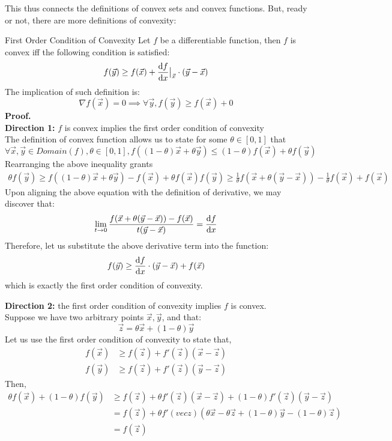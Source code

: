 This thus connects the definitions of convex sets and convex functions.
But, ready or not, there are more definitions of convexity:
\begin{ln-define}{First Order Condition of Convexity}{}
    Let $f$ be a differentiable function, then $f$ is convex iff the following condition is satisfied:
    \[
        f(\vec{y}) \geq f(\vec{x}) + \dv{f}{x} \big|_{\vec{x}} \cdot (\vec{y} - \vec{x})
    \]
    The implication of such definition is:
    \[
        \nabla f(\vec{x}) = 0 \implies \forall \vec{y}, f(\vec{y}) \geq f(\vec{x}) + 0
    \]
    \tcblower
    \textbf{Proof.} \\
    \textbf{Direction 1:} $f$ is convex implies the first order condition of convexity \\
    The definition of convex function allows us to state for some $\theta \in [0, 1]$ that
    \[
        \forall \vec{x}, \vec{y} \in Domain(f), \theta \in [0, 1], f((1 - \theta) \vec{x} + \theta \vec{y}) \leq (1 - \theta) f(\vec{x}) + \theta f(\vec{y})
    \]
    Rearranging the above inequality grants
    \begin{align*}
        \theta f(\vec{y}) \geq f((1 - \theta) \vec{x} + \theta \vec{y}) - f(\vec{x}) + \theta f(\vec{x})
        f(\vec{y}) \geq \frac{1}{\theta} f(\vec{x} + \theta (\vec{y} - \vec{x})) - \frac{1}{\theta} f(\vec{x}) + f(\vec{x})
    \end{align*}
    Upon aligning the above equation with the definition of derivative, we may discover that:
    \[
        \lim_{t \rightarrow 0} \frac{f(\vec{x} + \theta (\vec{y} - \vec{x})) - f(\vec{x})}{t (\vec{y} - \vec{x})} = \dv{f}{x}
    \]
    Therefore, let us substitute the above derivative term into the function:
    \[
        f(\vec{y}) \geq \dv{f}{x} \cdot (\vec{y} - \vec{x}) + f(\vec{x})
    \]
    which is exactly the first order condition of convexity.
    \par
    \textbf{Direction 2:} the first order condition of convexity implies $f$ is convex. \\
    Suppose we have two arbitrary points $\vec{x}, \vec{y}$, and that:
    \[
        \vec{z} = \theta \vec{x} + (1 - \theta) \vec{y}
    \]
    Let us use the first order condition of convexity to state that,
    \begin{align*}
        f(\vec{x}) &\geq f(\vec{z}) + f'(\vec{z}) (\vec{x} - \vec{z}) \\
        f(\vec{y}) &\geq f(\vec{z}) + f'(\vec{z}) (\vec{y} - \vec{z})
    \end{align*}
    Then,
    \begin{align*}
        \theta f(\vec{x}) + (1 - \theta) f(\vec{y})
        &\geq f(\vec{z}) + \theta f'(\vec{z}) (\vec{x} - \vec{z}) + (1 - \theta) f'(\vec{z}) (\vec{y} - \vec{z}) \\
        &= f(\vec{z}) + \theta f'(vec{z}) (\theta \vec{x} - \theta \vec{z} + (1 - \theta) \vec{y} - (1 - \theta) \vec{z}) \\
        &= f(\vec{z})
    \end{align*}
\end{ln-define}

